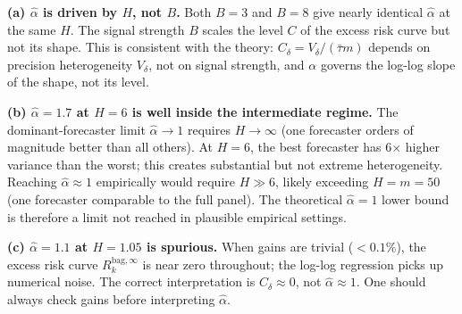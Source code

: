 \documentclass[12pt,a4paper]{article}
\theoremstyle{definition}
\newcommand{\Rk}{R_k^{\mathrm{bag},\infty}}
\begin{document}
\textbf{(a) $\hat\alpha$ is driven by $H$, not $B$.}  Both $B=3$ and $B=8$
give nearly identical $\hat\alpha$ at the same $H$.  The signal
strength $B$ scales the level $C$ of the excess risk curve but not its
shape.  This is consistent with the theory: $C_\delta=V_\delta/(\bar\tau m)$
depends on precision heterogeneity $V_\delta$, not on signal strength, and
$\alpha$ governs the log-log slope of the shape, not its level.

\textbf{(b) $\hat\alpha=1.7$ at $H=6$ is well inside the intermediate regime.}
The dominant-forecaster limit $\hat\alpha\to 1$ requires $H\to\infty$
(one forecaster orders of magnitude better than all others).  At $H=6$,
the best forecaster has 6$\times$ higher variance than the worst; this
creates substantial but not extreme heterogeneity.  Reaching $\hat\alpha\approx 1$
empirically would require $H\gg 6$, likely exceeding $H=m=50$ (one
forecaster comparable to the full panel).  The theoretical $\hat\alpha=1$
lower bound is therefore a limit not reached in plausible empirical settings.

\textbf{(c) $\hat\alpha=1.1$ at $H=1.05$ is spurious.}  When gains are
trivial ($<0.1\%$), the excess risk curve $\Rk$ is near zero throughout;
the log-log regression picks up numerical noise.  The correct interpretation
is $C_\delta\approx 0$, not $\hat\alpha\approx 1$.  One should always
check gains before interpreting $\hat\alpha$.
\end{document}
